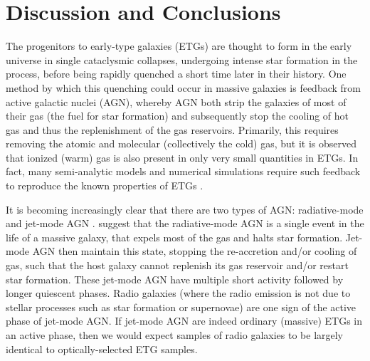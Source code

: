 \chapter{Discussion and Conclusions}
	\label{cha:conclusion}
The progenitors to early-type galaxies (ETGs) are thought to form in the early universe in single cataclysmic collapses, undergoing intense star formation in the process, before being rapidly quenched a short time later in their history. One method by which this quenching could occur in massive galaxies is feedback from active galactic nuclei (AGN), whereby AGN both strip the galaxies of most of their gas (the fuel for star formation) and subsequently stop the cooling of hot gas and thus the replenishment of the gas reservoirs. Primarily, this requires removing the atomic and molecular (collectively the cold) gas, but it is observed that ionized (warm) gas is also present in only very small quantities in ETGs. In fact, many semi-analytic models and numerical simulations require such feedback to reproduce the known properties of ETGs \citep[e.g.][]{Kauffmann2000, DiMatteo2005, Springel2005, Bower2006}. 

It is becoming increasingly clear that there are two types of AGN: radiative-mode and jet-mode AGN \citep[e.g.][]{Antonucci2012}. \citet{Heckman2014} suggest that the radiative-mode AGN is a single event in the life of a massive galaxy, that expels most of the gas and halts star formation. Jet-mode AGN then maintain this state, stopping the re-accretion and/or cooling of gas, such that the host galaxy cannot replenish its gas reservoir and/or restart star formation. These jet-mode AGN have multiple short activity followed by longer quiescent phases. Radio galaxies (where the radio emission is not due to stellar processes such as star formation or supernovae) are one sign of the active phase of jet-mode AGN. If jet-mode AGN are indeed ordinary (massive) ETGs in an active phase, then we would expect samples of radio galaxies to be largely identical to optically-selected ETG samples. 

